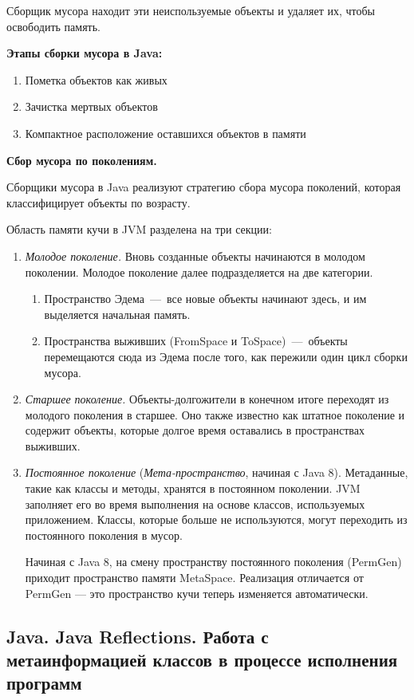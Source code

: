 \documentclass{article}
\begin{document}
Сборщик мусора находит эти неиспользуемые объекты и удаляет их, чтобы освободить память.

\textbf{Этапы сборки мусора в Java:}
\begin{enumerate}
	\item Пометка объектов как живых
	\item Зачистка мертвых объектов
	\item Компактное расположение оставшихся объектов в памяти
\end{enumerate} 

\textbf{Сбор мусора по поколениям.}

Сборщики мусора в Java реализуют стратегию сбора мусора поколений, которая классифицирует объекты по возрасту.

Область памяти кучи в JVM разделена на три секции:
\begin{enumerate}
	\item \emph{Молодое поколение.} 
	Вновь созданные объекты начинаются в молодом поколении. Молодое поколение далее подразделяется на две категории.
		\begin{enumerate}
			\item Пространство Эдема~---~все новые объекты начинают здесь, и им выделяется начальная память.
			\item Пространства выживших (FromSpace и ToSpace)~---~объекты перемещаются сюда из Эдема после того, как пережили один цикл сборки мусора.
		\end{enumerate}
	
	\item \emph{Старшее поколение.}
	Объекты-долгожители в конечном итоге переходят из молодого поколения в старшее. Оно также известно как штатное поколение и содержит объекты, которые долгое время оставались в пространствах выживших.
	\item \emph{Постоянное поколение} (\emph{Мета-пространство}, начиная с Java 8).
	Метаданные, такие как классы и методы, хранятся в постоянном поколении. JVM заполняет его во время выполнения на основе классов, используемых приложением. Классы, которые больше не используются, могут переходить из постоянного поколения в мусор.
	
	Начиная с Java 8, на смену пространству постоянного поколения (PermGen) приходит пространство памяти MetaSpace. Реализация отличается от PermGen — это пространство кучи теперь изменяется автоматически.
\end{enumerate}


\subsection{Java. Java Reflections. Работа с метаинформацией классов в процессе исполнения программ}
\end{document}

